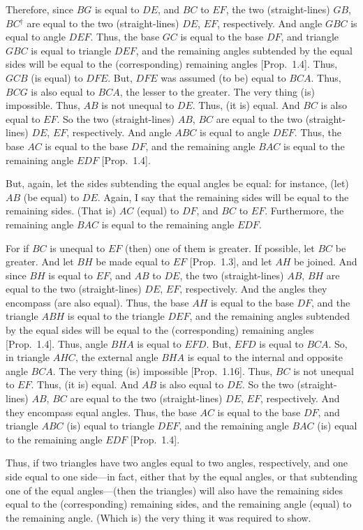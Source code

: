 \begin{Parallel}{}{}
{Therefore, since $BG$ is equal to $DE$, and $BC$ to $EF$, the two (straight-lines)
$GB$, $BC$$^\dag$ are equal to the two (straight-lines) $DE$, $EF$, respectively. And angle
$GBC$ is equal to angle $DEF$. Thus, the base $GC$ is equal to the base $DF$,
and triangle $GBC$ is equal to triangle $DEF$, and the remaining angles 
subtended by the equal sides will
be equal to the (corresponding) remaining angles [Prop.~1.4].
Thus, $GCB$ (is equal) to $DFE$. But,  $DFE$ was assumed (to be) equal to $BCA$.
Thus, $BCG$ is also equal to $BCA$, the lesser to the greater. The very thing (is) impossible. Thus, $AB$ is not unequal to $DE$. Thus, (it is) equal. And $BC$ is
also equal to $EF$. So the two (straight-lines) $AB$, $BC$ are equal to the two (straight-lines) $DE$, $EF$, respectively. And angle $ABC$ is equal to
angle $DEF$. Thus, the base $AC$ is equal to the base $DF$, and the remaining
angle $BAC$ is equal to the remaining angle $EDF$ [Prop.~1.4].

\epsfysize=1.5in
\centerline{}

But, again, let the sides subtending the equal angles be equal: for instance, 
(let) $AB$ (be equal) to
$DE$.  Again, I say that the remaining sides will be equal to the remaining
sides. (That is) $AC$ (equal) to $DF$, and $BC$ to $EF$. Furthermore, the remaining angle
$BAC$ is equal to the remaining angle $EDF$.

For if $BC$ is unequal to $EF$ (then) one of them is greater. If possible, let $BC$
be greater. And let $BH$ be made equal to $EF$ [Prop.~1.3], and let $AH$ be joined.
And since $BH$ is equal to $EF$, and $AB$ to $DE$, the two (straight-lines) $AB$, $BH$
are equal to the two (straight-lines) $DE$, $EF$, respectively. And the angles
they encompass (are also equal). Thus, the base $AH$ is equal to the base  
$DF$, and the triangle $ABH$ is equal to the triangle $DEF$, and the
remaining angles subtended by the equal sides will be equal to the
(corresponding) remaining angles [Prop.~1.4]. Thus, angle $BHA$ 
is equal to $EFD$. But, $EFD$ is equal to $BCA$. So, in triangle $AHC$,
the external angle $BHA$ is equal to the internal and opposite angle 
$BCA$. The very thing (is) impossible [Prop.~1.16]. Thus, $BC$ is not unequal to $EF$.
Thus, (it is) equal. And $AB$ is also equal to $DE$. So the two
(straight-lines) $AB$, $BC$ are equal to the two (straight-lines) $DE$, $EF$,
respectively. And they encompass equal angles. Thus, the base $AC$ is equal
to the base $DF$, and triangle $ABC$ (is) equal to triangle $DEF$, and the
remaining angle $BAC$ (is) equal to the remaining angle $EDF$ [Prop.~1.4].

Thus, if two triangles have two angles equal to two angles, respectively, 
and one side equal to one side---in fact, either that by the equal angles, or that
subtending one of the equal angles---(then the triangles) will also have the remaining sides equal to the (corresponding) remaining sides, and the
remaining angle (equal) to the remaining angle. (Which is) the very thing it
was required to show.}
\end{Parallel}

